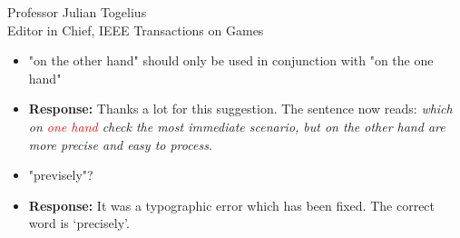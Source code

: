 \documentclass[10pt]{letter} %
\begin{document}
\begin{letter}{Professor Julian Togelius \\ Editor in Chief, IEEE Transactions on Games}
\begin{enumerate}
\begin{itemize}
\begin{itemize}
				\item 	"on the other hand" should only be used in conjunction with "on the one hand"
				\item {\bf Response:} 
                                  Thanks a lot for this suggestion. The sentence now reads: {\em which on \textcolor{red}{one hand} check the most immediate scenario, but on the other hand are more precise and easy to process.}
				\\
				\item 	"previsely"?
				\item {\bf Response:} It was a typographic error which has been fixed. The correct word is `precisely'.
			
			\end{itemize}
\end{itemize}	

\end{enumerate}
 






\end{letter}
\end{document}
